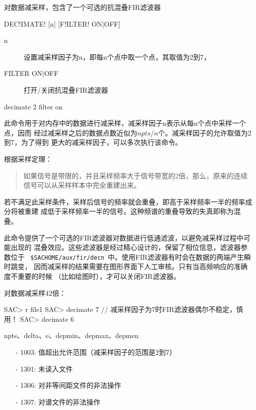 \label{cmd:decimate}

对数据减采样，包含了一个可选的抗混叠FIR滤波器

\begin{SACSTX}
DEC!IMATE! [n] [F!ILTER! ON|OFF]
\end{SACSTX}

\begin{description}
\item [n] 设置减采样因子为n，即每n个点中取一个点，其取值为2到7，
\item [FILTER ON|OFF] 打开/关闭抗混叠FIR滤波器
\end{description}

\begin{SACDFT}
decimate 2 filter on
\end{SACDFT}

此命令用于对内存中的数据进行减采样，减采样因子n表示从每n个点中采样一个点，因而
经过减采样之后的数据点数近似为$npts/n$个。减采样因子的允许取值为2到7，为了得到
更大的减采样因子，可以多次执行该命令。

根据采样定理：
\begin{quote}
如果信号是带限的，并且采样频率大于信号带宽的2倍，那么，原来的连续信号可以从采样样本中完全重建出来。
\end{quote}
若不满足此采样条件，采样后信号的频率就会重叠，即高于采样频率一半的频率成分将被重建
成低于采样频率一半的信号。这种频谱的重叠导致的失真即称为混叠。

此命令提供了一个可选的FIR滤波器对数据进行低通滤波，以避免减采样过程中可能出现的
混叠效应。这些滤波器是经过精心设计的，保留了相位信息，滤波器参数位于
~\lstinline{$SACHOME/aux/fir/decn}~中。使用FIR滤波器有时会在数据的两端产生瞬时跳变，
因而减采样的结果需要在图形界面下人工审核。只有当高频响应的准确度不重要的时候
（比如绘图时），才可以关闭FIR滤波器。

对数据减采样42倍：
\begin{SACCode}
SAC> r file1
SAC> decimate 7     // 减采样因子为7时FIR滤波器偶尔不稳定，慎用！
SAC> decimate 6
\end{SACCode}

npts、delta、e、depmin、depmax、depmen

\begin{itemize}
\item[-]1003: 值超出允许范围（减采样因子的范围是2到7）
\item[-]1301: 未读入文件
\item[-]1306: 对非等间距文件的非法操作
\item[-]1307: 对谱文件的非法操作
\end{itemize}
